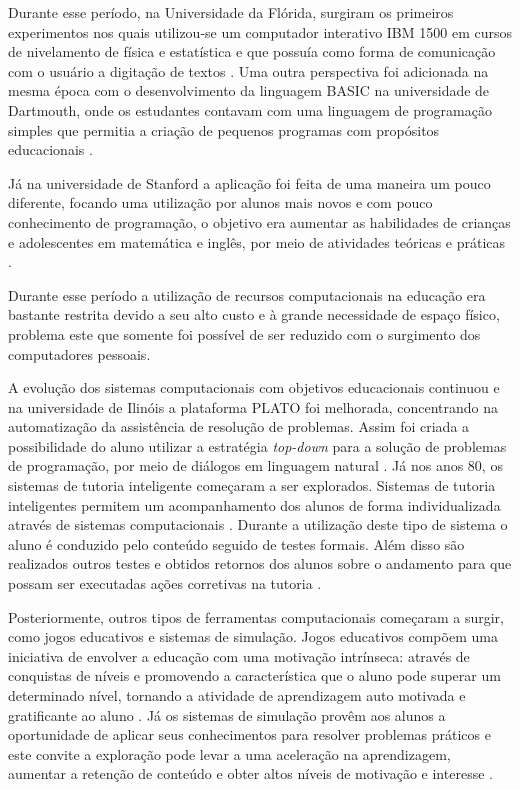 Durante esse período, na Universidade da Flórida, surgiram os primeiros experimentos nos quais utilizou-se um computador interativo IBM 1500 em cursos de nivelamento de física e estatística e que possuía como forma de comunicação com o usuário a digitação de textos \cite{chambers80}. Uma outra perspectiva foi adicionada na mesma época com o desenvolvimento da linguagem BASIC na universidade de Dartmouth, onde os estudantes contavam com uma linguagem de programação simples que permitia a criação de pequenos programas com propósitos educacionais \cite{chambers80}. 

Já na universidade de Stanford a aplicação foi feita de uma maneira um pouco diferente, focando uma utilização por alunos mais novos e com pouco conhecimento de programação, o objetivo era aumentar as habilidades de crianças e adolescentes em matemática e inglês, por meio de atividades teóricas e práticas \cite{chambers80}.

Durante esse período a utilização de recursos computacionais na educação era bastante restrita devido a seu alto custo e à grande necessidade de espaço físico, problema este que somente foi possível de ser reduzido com o surgimento dos computadores pessoais. 

A evolução dos sistemas computacionais com objetivos educacionais continuou e na universidade de Ilinóis a plataforma PLATO foi melhorada, concentrando na automatização da assistência de resolução de problemas. Assim foi criada a possibilidade do aluno utilizar a estratégia \emph{top-down} para a solução de problemas de programação, por meio de diálogos em linguagem natural \cite{danielson75}. Já nos anos 80, os sistemas de tutoria inteligente começaram a ser explorados. Sistemas de tutoria inteligentes permitem um acompanhamento dos alunos de forma individualizada através de sistemas computacionais \cite{bloom84}. Durante a utilização deste tipo de sistema o aluno é conduzido pelo conteúdo seguido de testes formais. Além disso são realizados outros testes e obtidos retornos dos alunos sobre o andamento para que possam ser executadas ações corretivas na tutoria \cite{bloom84}.

Posteriormente, outros tipos de ferramentas computacionais começaram a surgir, como jogos educativos e sistemas de simulação. Jogos educativos compõem uma iniciativa de envolver a educação com uma motivação intrínseca: através de conquistas de níveis e promovendo a característica que o aluno pode superar um determinado nível, tornando a atividade de aprendizagem auto motivada e gratificante ao aluno \cite{amory99}. Já os sistemas de simulação provêm aos alunos a oportunidade de aplicar seus conhecimentos para resolver problemas práticos e este  convite a exploração pode levar a uma aceleração na aprendizagem, aumentar a retenção de conteúdo e obter altos níveis de motivação e interesse \cite{vandam07}.

